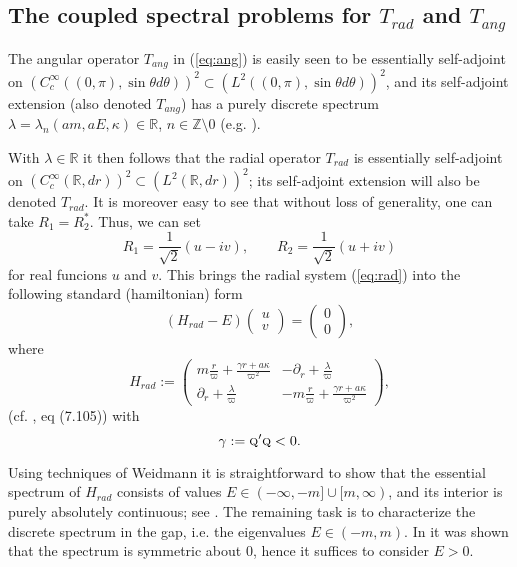 \documentclass[11 pt]{article}
\renewcommand\({\left(}
\renewcommand\){\right)}
\newcommand\<{\langle}
\renewcommand\>{\rangle}
\newcommand\8{\infty}
\newcommand\beq{\begin{equation}}
\newcommand\eeq{\end{equation}}
\newcommand{\ga} {\gamma}\newcommand{\Ga}{\Gamma}
\newcommand{\la} {\lambda}\newcommand{\La}{\Lambda}
\newcommand{\R}{\mathbb R}
\newcommand{\pd}{\partial}
\newcommand{\Z}{\mathbb{Z}}
\newcommand{\De}{\varpi}
\begin{document}
 \subsection{The coupled spectral problems for $T_{rad}$ and $T_{ang}$}\label{Eval}
 
 The angular operator $T_{ang}$ in (\ref{eq:ang}) is easily seen to be essentially self-adjoint on
 $(C^\infty_c((0,\pi),\sin\theta d\theta))^2 \subset (L^2((0,\pi),\sin\theta d\theta))^2$, and its self-adjoint extension (also denoted $T_{ang}$) has a
purely discrete spectrum $\la=\la_n(am,aE,\kappa)\in \R$, $n\in \Z\setminus 0$ (e.g. \cite{SufFacCos83,BSW}).

With $\la\in\R$ it then follows that the radial operator $T_{rad}$ is essentially self-adjoint on $(C^\infty_c(\R, dr))^2\subset (L^2(\R,dr))^2$;
its self-adjoint extension will also be denoted $T_{rad}$.
It is moreover easy to see that without loss of generality, one can take $R_1 = R_2^*$.  Thus, we can set
\beq
R_1 =\frac{1}{\sqrt{2}}( u-iv),\qquad R_2  =\frac{1}{\sqrt{2}}( u + iv)
\eeq
 for real funcions $u$ and $v$.
 This brings the radial system (\ref{eq:rad}) into the following standard (hamiltonian) form
\beq\label{eq:hamil}
(H_{rad} -E)\left(\begin{array}{c} u \\ v \end{array}\right) = \left(\begin{array}{c}0 \\ 0 \end{array}\right),
\eeq
where
\beq\label{eq:Hrad}
H_{rad} := \left(\begin{array}{cc} m \frac{r}{\De} + \frac{\ga r+a\kappa}{\De^2} & -\pd_r + \frac{\la}{\De} \\[20pt]
 \pd_r +\frac{\la}{\De} & -m\frac{r}{\De} + \frac{\ga r+a\kappa}{\De^2}  \end{array}\right),
\eeq
(cf. \cite{ThallerBOOK}, eq (7.105)) with
\beq
\ga := \textsc{q}'\textsc{q} <0.
\eeq  

 Using techniques of Weidmann it is straightforward to show that the essential spectrum of $H_{rad}$ consists of values $E\in (-\infty,-m]\cup[m,\infty)$, 
 and its interior is purely absolutely continuous; see  \cite{KTZzGKNDa}.
  The remaining task is to characterize the discrete spectrum in the gap, i.e. the eigenvalues $E\in (-m,m)$. 
  In \cite{KTZzGKNDa} it was shown that the spectrum is symmetric about $0$, hence it suffices to consider $E>0$.
  
\end{document}
